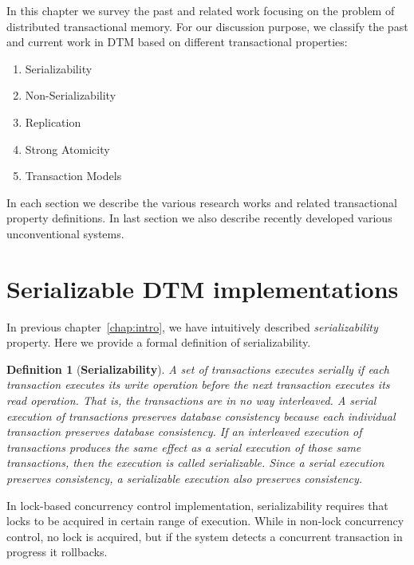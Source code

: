 \documentclass[12pt,english]{report}
\newtheorem{definition}{Definition}[section]
\begin{document}
In this chapter we survey the past and related work focusing on the problem of distributed transactional memory. For our discussion purpose, we classify the past and current work in DTM based on different transactional properties:

\begin{enumerate}
\item Serializability
\item Non-Serializability 
\item Replication 
\item Strong Atomicity
\item Transaction Models
\end{enumerate}

In each section we describe the various research works and related transactional property definitions. In last section we also describe recently developed various unconventional systems.

\section{Serializable DTM implementations}

In previous chapter~\ref{chap:intro}, we have intuitively described \textit{serializability} property. Here we provide a formal definition of serializability. 

\begin{definition}[\textbf{Serializability}]
A set of transactions executes serially if each transaction executes its write operation before the next transaction executes its read operation. That is, the transactions are in no way interleaved. A serial execution of transactions preserves database consistency because each individual transaction preserves
database consistency. If an interleaved execution of transactions produces the same effect as a serial execution of those same transactions, then the execution is called serializable. Since a serial execution preserves consistency, a serializable execution also preserves consistency.~\cite{serializabilityFormal}
\end{definition}

In lock-based concurrency control implementation, serializability requires that locks to be acquired in certain range of execution. While in non-lock concurrency control, no lock is acquired, but if the system detects a concurrent transaction in progress it rollbacks.
\end{document}

